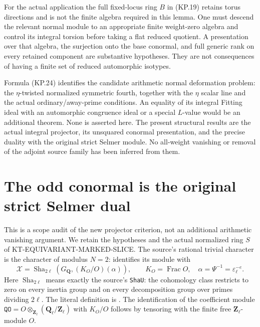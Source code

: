 \documentclass[11pt,a4paper]{article}
\theoremstyle{definition}
\begin{document}
For the actual application the full fixed-locus ring $B$
in (KP.19) retains torus directions and is not the finite
algebra required in this lemma.  One must descend the
relevant normal module to an appropriate finite
weight-zero algebra and control its integral torsion
before taking a flat reduced quotient.  A presentation
over that algebra, the surjection onto the base conormal,
and full generic rank on every retained component are
substantive hypotheses.  They are not consequences of
having a finite set of reduced automorphic isotypes.

Formula (KP.24) identifies the candidate arithmetic normal
deformation problem: the $\eta$-twisted normalized symmetric
fourth, together with the $\eta$ scalar line and the actual
ordinary/away-prime conditions.  An equality of its integral
Fitting ideal with an automorphic congruence ideal or a
special $L$-value would be an additional theorem.  None is
asserted here.  The present structural results are the
actual integral projector, its unsquared conormal presentation,
and the precise duality with the original strict Selmer
module.  No all-weight vanishing or removal of the adjoint
source family has been inferred from them.



\section{The odd conormal is the original strict Selmer dual}
\label{sec:kt-projector-equivalence}

This is a scope audit of the new projector criterion, not an
additional arithmetic vanishing argument.  We retain the
hypotheses and the actual normalized ring $S$ of
KT-EQUIVARIANT-MARKED-SLICE.  The source's rational trivial
character is the character of modulus $N=2$:
identifies its module with
\[
 \mathcal X=\operatorname{Sha}_{2\ell}
              (G_{\mathbf Q},(K_O/O)(\alpha)),\qquad
 K_O=\operatorname{Frac}O,\quad
 \alpha=\Psi^{-1}=\varepsilon_\ell^{-e}.                    \tag{KE.1}
\]
Here $\operatorname{Sha}_{2\ell}$ means exactly the source's
\texttt{ShaU}: the cohomology class restricts to zero on
every inertia group and on every decomposition group over
primes dividing $2\ell$.  The literal definition is
.
The identification of the coefficient module
$\texttt{QO}=O\otimes_{\mathbf Z_\ell}(\mathbf Q_\ell/\mathbf Z_\ell)$
with $K_O/O$ follows by tensoring with the finite free
$\mathbf Z_\ell$-module $O$.
\end{document}
